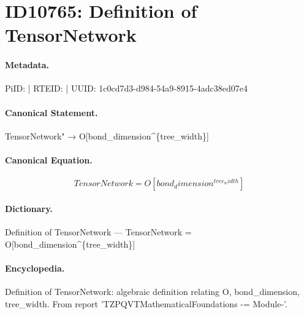 \section*{ID10765: Definition of TensorNetwork}
\paragraph{Metadata.}
PiID:  | RTEID:  | UUID: 1c0cd7d3-d984-54a9-8915-4adc38ed07e4

\paragraph{Canonical Statement.}
TensorNetwork" → O[bond\_dimension\textasciicircum{}\{tree\_width\}]

\paragraph{Canonical Equation.}
\[
TensorNetwork = O[bond_dimension^{tree_width}]
\]

\paragraph{Dictionary.}
Definition of TensorNetwork — TensorNetwork = O[bond\_dimension\textasciicircum{}\{tree\_width\}]

\paragraph{Encyclopedia.}
Definition of TensorNetwork: algebraic definition relating O, bond\_dimension, tree\_width. From report 'TZPQVTMathematicalFoundations -= Module-'.
